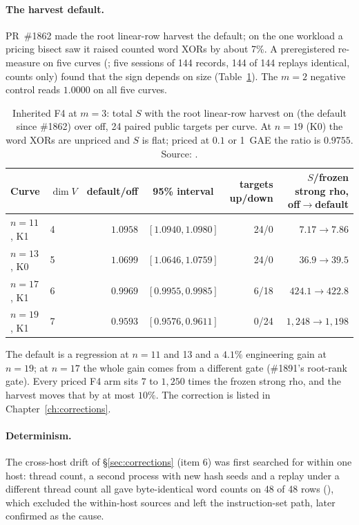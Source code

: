 \paragraph{The harvest default.} PR~\#1862 made the root linear-row harvest
the default; on the one workload a pricing bisect saw it raised counted word
XORs by about 7\%. A preregistered re-measure on five curves
(; five sessions of 144
records, 144 of 144 replays identical, counts only) found that the sign
depends on size (Table~\ref{tab:bo-harvest}). The $m=2$ negative control
reads $1.0000$ on all five curves.

\begin{table}[t]
\centering\small
\begin{tabular}{@{}llrcrr@{}}
\toprule
Curve & $\dim V$ & default/off & 95\% interval & targets up/down & $S$/frozen strong rho, off$\to$default \\
\midrule
$n=11$, K1 & 4 & $1.0958$ & $[1.0940,1.0980]$ & 24/0 & $7.17\to7.86$ \\
$n=13$, K0 & 5 & $1.0699$ & $[1.0646,1.0759]$ & 24/0 & $36.9\to39.5$ \\
$n=17$, K1 & 6 & $0.9969$ & $[0.9955,0.9985]$ & 6/18 & $424.1\to422.8$ \\
$n=19$, K1 & 7 & $0.9593$ & $[0.9576,0.9611]$ & 0/24 & $1{,}248\to1{,}198$ \\
\bottomrule
\end{tabular}
\caption[]{Inherited F4 at $m=3$: total $S$ with the root linear-row harvest
on (the default since \#1862) over off, 24 paired public targets per curve.
At $n=19$ (K0) the word XORs are unpriced and $S$ is flat; priced at $0.1$
or 1~GAE the ratio is $0.9755$. Source:
.}
\label{tab:bo-harvest}
\end{table}

\noindent The default is a regression at $n=11$ and 13 and a $4.1\%$
engineering gain at $n=19$; at $n=17$ the whole gain comes from a different
gate (\#1891's root-rank gate). Every priced F4 arm sits $7$ to $1{,}250$
times the frozen strong rho, and the harvest moves that by at most $10\%$. The
correction is listed in Chapter~\ref{ch:corrections}.

\paragraph{Determinism.} The cross-host drift of \S\ref{sec:corrections}
(item 6) was first searched for within one host: thread count, a second
process with new hash seeds and a replay under a different thread count
all gave byte-identical word counts on 48 of 48 rows
(), which
excluded the within-host sources and left the instruction-set path, later
confirmed as the cause.

